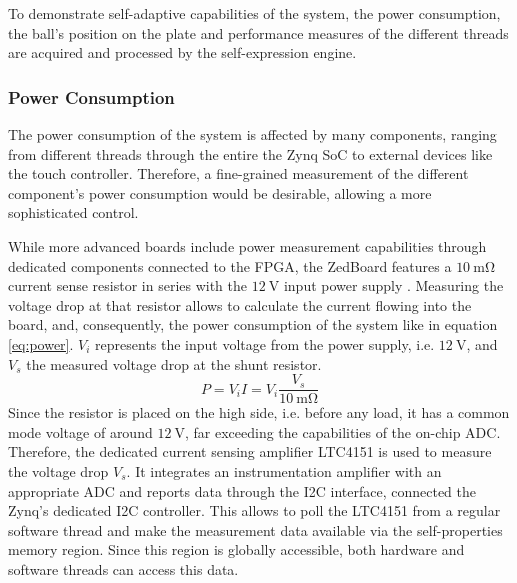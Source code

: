 To demonstrate self-adaptive capabilities of the system, the power
consumption, the ball's position on the plate and performance measures of the
different threads are acquired and processed by the self-expression engine.

\subsubsection{Power Consumption}
The power consumption of the system is affected by many components, ranging
from different threads through the entire the Zynq \ac{SoC} to external
devices like the touch controller. Therefore, a fine-grained measurement of
the different component's power consumption would be desirable, allowing a
more sophisticated control.

While more advanced boards include power measurement capabilities through
dedicated components connected to the FPGA, the ZedBoard features a
$\SI{10}{\milli\ohm}$ current sense resistor in series with the
$\SI{12}{\volt}$ input power supply \citep{ZedBoard}. Measuring the voltage
drop at that resistor allows to calculate the current flowing into the board,
and, consequently, the power consumption of the system like in equation
\ref{eq:power}. $V_i$ represents the input voltage from the power supply, i.e.
$\SI{12}{\volt}$, and $V_s$ the measured voltage drop at the shunt resistor.
\begin{equation}
P = V_i I = V_i \frac{V_s}{\SI{10}{\milli\ohm}}
\label{eq:power}
\end{equation}
Since the resistor is placed on the high side, i.e. before any load, it has a
common mode voltage of around $\SI{12}{\volt}$, far exceeding the capabilities
of the on-chip \ac{ADC}. Therefore, the dedicated current sensing amplifier
LTC4151 is used to measure the voltage drop $V_s$. It integrates an
instrumentation amplifier with an appropriate \ac{ADC} and reports data
through the \ac{I2C} interface, connected the Zynq's dedicated \ac{I2C}
controller. This allows to poll the LTC4151 from a regular software thread and
make the measurement data available via the self-properties memory region.
Since this region is globally accessible, both hardware and software threads
can access this data.

